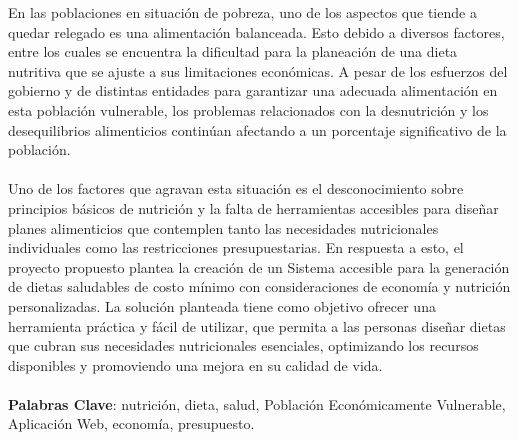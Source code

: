 
En las poblaciones en situaci\'on de pobreza, uno de los aspectos que tiende a quedar relegado es una alimentaci\'on balanceada. Esto debido a diversos factores, entre los cuales se encuentra la dificultad  para la planeaci\'on de una dieta nutritiva que se ajuste a sus limitaciones econ\'omicas. A pesar de los esfuerzos del gobierno y de distintas entidades para garantizar una adecuada alimentaci\'on en esta poblaci\'on vulnerable, los problemas  relacionados con la desnutrici\'on y los desequilibrios alimenticios contin\'uan afectando a un porcentaje significativo de la poblaci\'on.
\\
\\
Uno de los factores que agravan esta situaci\'on es el desconocimiento sobre principios b\'asicos de nutrici\'on y la falta de herramientas accesibles para dise\~{n}ar planes alimenticios que contemplen tanto las necesidades nutricionales individuales como las restricciones presupuestarias. En respuesta a esto, el proyecto propuesto plantea la creaci\'on de un Sistema accesible para la generaci\'on de dietas saludables de costo m\'inimo con consideraciones de econom\'ia y nutrici\'on personalizadas. La soluci\'on planteada tiene como objetivo ofrecer una herramienta pr\'actica y f\'acil de utilizar, que permita a las personas dise\~{n}ar dietas que cubran sus necesidades nutricionales esenciales, optimizando los recursos disponibles y promoviendo una mejora en su calidad de vida.
\\
\\
{\bf Palabras Clave}: nutrici\'on, dieta, salud, Poblaci\'on Econ\'omicamente Vulnerable, Aplicaci\'on Web, econom\'ia, presupuesto.
